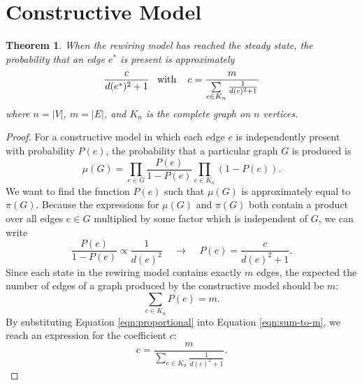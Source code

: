 \documentclass[a4paper,10pt]{article}
\newtheorem{theorem}{Theorem}
\begin{document}
\section{Constructive Model}
\begin{theorem}
\label{thm:perc}
When the rewiring model has reached the steady state, the probability that an edge $e^*$ is present is approximately
\begin{equation*}
 \frac{c}{d(e^*)^2 + 1} \mbox{\;\;\;with\;\;\; } c =\frac{m}{\sum\limits_{e \in K_n} \frac{1}{d(e)^2 + 1}}
\end{equation*}
where $n = |V|$, $m = |E|$, and $K_n$ is the complete graph on $n$ vertices.
\end{theorem}
\begin{proof}
For a constructive model in which each edge $e$ is independently present with probability $P(e)$, the probability that a particular graph $G$ is produced is
\begin{equation}
 \mu(G) = \prod\limits_{e \in G} \frac{P(e)}{1 - P(e)} \prod\limits_{e \in K_n} (1 - P(e)).
\end{equation}
We want to find the function $P(e)$ such that $\mu(G)$ is approximately equal to $\pi(G)$. Because the expressions for $\mu(G)$ and $\pi(G)$ both contain a product over all edges $e \in G$ multiplied by some factor which is independent of $G$, we can write
\begin{equation}
\label{eqn:proportional}
 \frac{P(e)}{1-P(e)} \propto \frac{1}{d(e)^2} \;\;\;\;\longrightarrow\;\;\;\; P(e) = \frac{c}{d(e)^2 + 1}.
\end{equation}
Since each state in the rewiring model contains exactly $m$ edges, the expected the number of edges of a graph produced by the constructive model should be $m$:
\begin{equation}
\label{eqn:sum-to-m}
 \sum_{e \in K_n} P(e) = m.
\end{equation}
By substituting Equation \ref{eqn:proportional} into Equation \ref{eqn:sum-to-m}, we reach an expression for the coefficient $c$:
\begin{equation}
\label{eqn:c}
 c = \frac{m}{\sum\limits_{e \in K_n} \frac{1}{d(e)^2 + 1}}.
\end{equation}
\end{proof}
\end{document}
